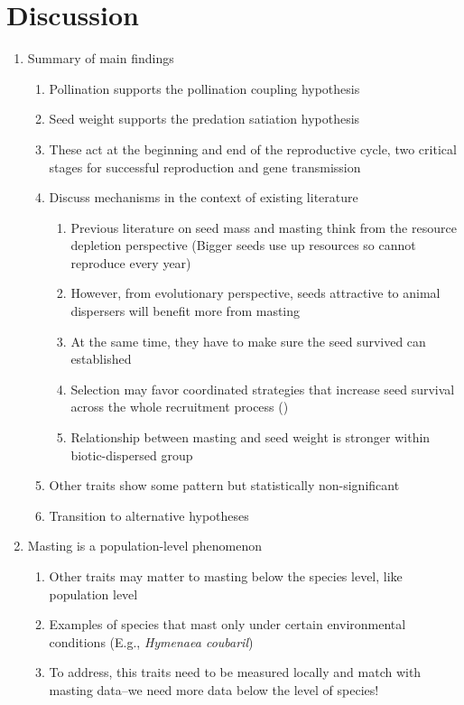 \documentclass{article}
\begin{document}
\section{Discussion}
\begin{enumerate}
\item Summary of main findings
\begin{enumerate}
\item Pollination supports the pollination coupling hypothesis
\item Seed weight supports the predation satiation hypothesis
\item These act at the beginning and end of the reproductive cycle, two critical stages for successful reproduction and gene transmission
\item Discuss mechanisms in the context of existing literature
\begin{enumerate}
\item Previous literature on seed mass and masting think from the resource depletion perspective (Bigger seeds use up resources so cannot reproduce every year)
\item However, from evolutionary perspective, seeds attractive to animal dispersers will benefit more from masting
\item At the same time, they have to make sure the seed survived can established
\item Selection may favor coordinated strategies that increase seed survival across the whole recruitment process (\cite{bonal2007satiation, moles2004seedling})
\item Relationship between masting and seed weight is stronger within biotic-dispersed group
\end{enumerate}
\item Other traits show some pattern but statistically non-significant
\item Transition to alternative hypotheses
\end{enumerate}
\item Masting is a population-level phenomenon
\begin{enumerate}
\item Other traits may matter to masting below the species level, like population level
\item Examples of species that mast only under certain environmental conditions (E.g., \textit{Hymenaea coubaril})
\item To address, this traits need to be measured locally and match with masting data--we need more data below the level of species!

\end{enumerate}
\end{enumerate}
\end{document}
